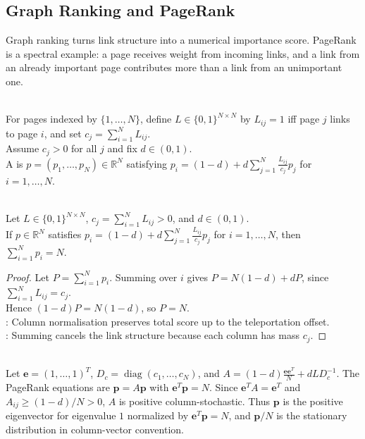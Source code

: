 \subsection{Graph Ranking and PageRank}

Graph ranking turns link structure into a numerical importance score.  PageRank is a spectral example: a page receives weight from incoming links, and a link from an already important page contributes more than a link from an unimportant one.

\begin{definition} \label{def:sl-pagerank-link-matrix} \\
For pages indexed by $\{1,\ldots,N\}$, define $L\in\{0,1\}^{N\times N}$ by $L_{ij}=1$ iff page $j$ links to page $i$, and set $c_j=\sum\limits_{i=1}^N L_{ij}$.\\
Assume $c_j>0$ for all $j$ and fix $d\in(0,1)$.\\
A  is $p=(p_1,\ldots,p_N)\in\mathbb{R}^N$ satisfying $p_i=(1-d)+d\sum\limits_{j=1}^N\frac{L_{ij}}{c_j}p_j$ for $i=1,\ldots,N$.
\end{definition}

\begin{proposition} \label{prop:sl-pagerank-normalization} \\
Let $L\in\{0,1\}^{N\times N}$, $c_j=\sum\limits_{i=1}^N L_{ij}>0$, and $d\in(0,1)$.\\
If $p\in\mathbb{R}^N$ satisfies $p_i=(1-d)+d\sum\limits_{j=1}^N\frac{L_{ij}}{c_j}p_j$ for $i=1,\ldots,N$, then $\sum\limits_{i=1}^Np_i=N$.
\begin{proof} Let $P=\sum\limits_{i=1}^Np_i$. Summing over $i$ gives $P=N(1-d)+dP$, since $\sum\limits_{i=1}^NL_{ij}=c_j$.\\
Hence $(1-d)P=N(1-d)$, so $P=N$.\\
: Column normalisation preserves total score up to the teleportation offset.\\
: Summing cancels the link structure because each column has mass $c_j$.
\end{proof}
\end{proposition}

\begin{method} \label{meth:sl-pagerank-eigenvector-form} \\
Let $\mathbf{e}=(1,\ldots,1)^T$, $D_c=\operatorname{diag}(c_1,\ldots,c_N)$, and $A=(1-d)\frac{\mathbf{e}\mathbf{e}^T}{N}+dLD_c^{-1}$.
The PageRank equations are $\mathbf{p}=A\mathbf{p}$ with $\mathbf{e}^T\mathbf{p}=N$. Since $\mathbf{e}^TA=\mathbf{e}^T$ and $A_{ij}\geq(1-d)/N>0$, $A$ is positive column-stochastic. Thus $\mathbf{p}$ is the positive eigenvector for eigenvalue $1$ normalized by $\mathbf{e}^T\mathbf{p}=N$, and $\mathbf{p}/N$ is the stationary distribution in column-vector convention.
\end{method}

